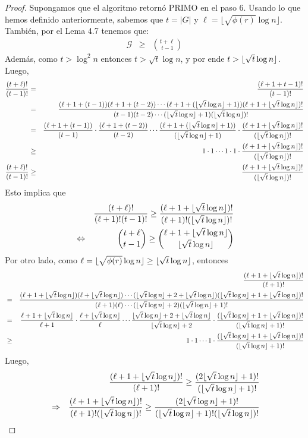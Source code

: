	\begin{proof}
	Supongamos que el algoritmo retornó PRIMO en el paso 6. Usando lo que hemos definido anteriormente, sabemos que $t=|G|$ y $\ell  = \lfloor \sqrt{\phi(r)}\log  n\rfloor$. También, por el Lema 4.7  tenemos que:
	\begin{eqnarray}
		\mathcal{G}&\geq &{{t+\ell }\choose{t-1}}\label{eq:10}
	\end{eqnarray}
	Además, como $t>\log ^2 n$ entonces $t>\sqrt{t}\log  n$, y por ende $t>\lfloor\sqrt{t}\log n\rfloor$. Luego,
	\begin{eqnarray}
		\frac{(t+\ell )!}{(t-1)!} &=& \frac{(\ell +1+t-1)!}{(t-1)!}\nonumber\\
		&=&\frac{(\ell +1+(t-1))(\ell +1+(t-2))\cdots(\ell +1+(\lfloor\sqrt{t}\log n\rfloor+1))(\ell +1+\lfloor\sqrt{t}\log n\rfloor)!}{(t-1)(t-2)\cdots (\lfloor\sqrt{t}\log n\rfloor+1)(\lfloor\sqrt{t}\log n\rfloor)!}\nonumber\\
		&=& \frac{(\ell +1+(t-1))}{(t-1)}\cdot\frac{(\ell +1+(t-2))}{(t-2)}\cdots\frac{(\ell +1+(\lfloor\sqrt{t}\log n\rfloor+1))}{(\lfloor\sqrt{t}\log n\rfloor+1)}\cdot\frac{(\ell +1+\lfloor\sqrt{t}\log n\rfloor)!}{(\lfloor\sqrt{t}\log n\rfloor)!}\nonumber\\
		&\geq & 1\cdot1\cdots1\cdot1\cdot\frac{(\ell +1+\lfloor\sqrt{t}\log n\rfloor)!}{(\lfloor\sqrt{t}\log n\rfloor)!}\nonumber\\
		\frac{(t+\ell )!}{(t-1)!} &\geq & \frac{(\ell +1+\lfloor\sqrt{t}\log n\rfloor)!}{(\lfloor\sqrt{t}\log n\rfloor)!}\nonumber
	\end{eqnarray}
Esto implica que 
\begin{eqnarray}
	& &\frac{(t+\ell )!}{(\ell +1)!(t-1)!} \geq \frac{(\ell +1+\lfloor\sqrt{t}\log n\rfloor)!}{(\ell +1)!(\lfloor\sqrt{t}\log n\rfloor)!}\nonumber\\
	&\Leftrightarrow &{{t+\ell }\choose{t-1}}\geq {{\ell +1+\lfloor\sqrt{t}\log n\rfloor}\choose{\lfloor\sqrt{t}\log n\rfloor}}\label{eq:11}
\end{eqnarray}	
Por otro lado, como $\ell =\lfloor \sqrt{\phi(r)}\log  n\rfloor\geq \lfloor\sqrt{t}\log n\rfloor$, entonces
\begin{eqnarray}
	& &\frac{(\ell +1+\lfloor\sqrt{t}\log n\rfloor)!}{(\ell +1)!}\nonumber\\
	&= &\frac{(\ell +1+\lfloor\sqrt{t}\log n\rfloor)(\ell +\lfloor\sqrt{t}\log n\rfloor)\cdots (\lfloor\sqrt{t}\log n\rfloor+2+\lfloor\sqrt{t}\log n\rfloor)(\lfloor\sqrt{t}\log n\rfloor+1+\lfloor\sqrt{t}\log n\rfloor)!}{(\ell +1)(\ell )\cdots (\lfloor\sqrt{t}\log n\rfloor+2)(\lfloor\sqrt{t}\log n\rfloor+1)!}\nonumber\\
	&= &\frac{\ell +1+\lfloor\sqrt{t}\log n\rfloor}{\ell +1}\cdot\frac{\ell +\lfloor\sqrt{t}\log n\rfloor}{\ell }\cdots\frac{\lfloor\sqrt{t}\log n\rfloor+2+\lfloor\sqrt{t}\log n\rfloor}{\lfloor\sqrt{t}\log n\rfloor+2}\cdot\frac{(\lfloor\sqrt{t}\log n\rfloor+1+\lfloor\sqrt{t}\log n\rfloor)!}{(\lfloor\sqrt{t}\log n\rfloor+1)!}\nonumber\\
	&\geq &1\cdot 1\cdots 1 \cdot\frac{(\lfloor\sqrt{t}\log n\rfloor+1+\lfloor\sqrt{t}\log n\rfloor)!}{(\lfloor\sqrt{t}\log n\rfloor+1)!}\nonumber
\end{eqnarray}
Luego, 
\begin{eqnarray}
	& &\frac{(\ell +1+\mia)!}{(\ell +1)!}\geq \frac{(2\mia+1)!}{(\mia+1)!}\nonumber\\
	&\Rightarrow &\frac{(\ell +1+\mia)!}{(\ell +1)!(\mia)!}\geq \frac{(2\mia+1)!}{(\mia+1)!(\mia)!}\nonumber\\

\end{eqnarray}
\end{proof}
